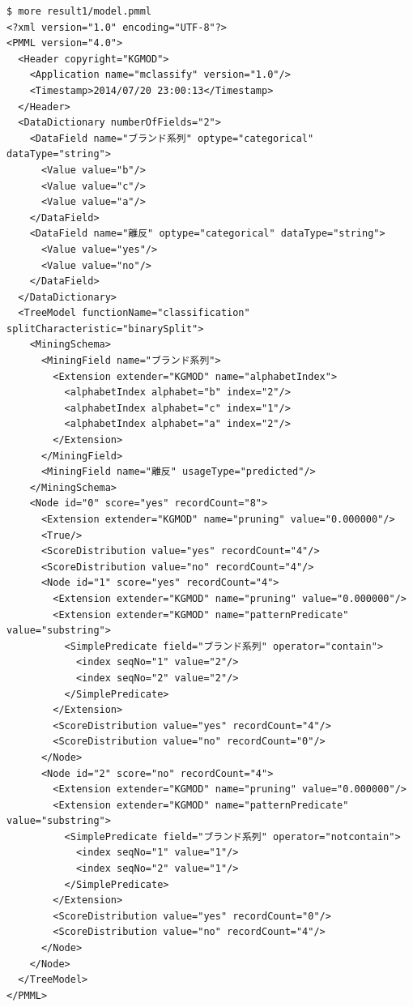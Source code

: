 \begin{Verbatim}[baselinestretch=0.7,frame=single]
$ more result1/model.pmml
<?xml version="1.0" encoding="UTF-8"?>
<PMML version="4.0">
  <Header copyright="KGMOD">
    <Application name="mclassify" version="1.0"/>
    <Timestamp>2014/07/20 23:00:13</Timestamp>
  </Header>
  <DataDictionary numberOfFields="2">
    <DataField name="ブランド系列" optype="categorical" dataType="string">
      <Value value="b"/>
      <Value value="c"/>
      <Value value="a"/>
    </DataField>
    <DataField name="離反" optype="categorical" dataType="string">
      <Value value="yes"/>
      <Value value="no"/>
    </DataField>
  </DataDictionary>
  <TreeModel functionName="classification" splitCharacteristic="binarySplit">
    <MiningSchema>
      <MiningField name="ブランド系列">
        <Extension extender="KGMOD" name="alphabetIndex">
          <alphabetIndex alphabet="b" index="2"/>
          <alphabetIndex alphabet="c" index="1"/>
          <alphabetIndex alphabet="a" index="2"/>
        </Extension>
      </MiningField>
      <MiningField name="離反" usageType="predicted"/>
    </MiningSchema>
    <Node id="0" score="yes" recordCount="8">
      <Extension extender="KGMOD" name="pruning" value="0.000000"/>
      <True/>
      <ScoreDistribution value="yes" recordCount="4"/>
      <ScoreDistribution value="no" recordCount="4"/>
      <Node id="1" score="yes" recordCount="4">
        <Extension extender="KGMOD" name="pruning" value="0.000000"/>
        <Extension extender="KGMOD" name="patternPredicate" value="substring">
          <SimplePredicate field="ブランド系列" operator="contain">
            <index seqNo="1" value="2"/>
            <index seqNo="2" value="2"/>
          </SimplePredicate>
        </Extension>
        <ScoreDistribution value="yes" recordCount="4"/>
        <ScoreDistribution value="no" recordCount="0"/>
      </Node>
      <Node id="2" score="no" recordCount="4">
        <Extension extender="KGMOD" name="pruning" value="0.000000"/>
        <Extension extender="KGMOD" name="patternPredicate" value="substring">
          <SimplePredicate field="ブランド系列" operator="notcontain">
            <index seqNo="1" value="1"/>
            <index seqNo="2" value="1"/>
          </SimplePredicate>
        </Extension>
        <ScoreDistribution value="yes" recordCount="0"/>
        <ScoreDistribution value="no" recordCount="4"/>
      </Node>
    </Node>
  </TreeModel>
</PMML>
\end{Verbatim}

